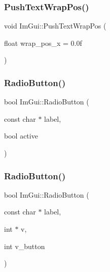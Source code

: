 \mbox{\label{namespace_im_gui_ab3b203dc94e7ee61a524609b3f3be50a}} 
\subsubsection{\texorpdfstring{Push\+Text\+Wrap\+Pos()}{PushTextWrapPos()}}
{\footnotesize\ttfamily void Im\+Gui\+::\+Push\+Text\+Wrap\+Pos (\begin{DoxyParamCaption}\item[{float}]{wrap\+\_\+pos\+\_\+x = {\ttfamily 0.0f} }\end{DoxyParamCaption})}

\mbox{\label{namespace_im_gui_a6b146763845cbad5a4144772279631bc}} 
\subsubsection{\texorpdfstring{Radio\+Button()}{RadioButton()}\hspace{0.1cm}{\footnotesize\ttfamily [1/2]}}
{\footnotesize\ttfamily bool Im\+Gui\+::\+Radio\+Button (\begin{DoxyParamCaption}\item[{const char $\ast$}]{label,  }\item[{bool}]{active }\end{DoxyParamCaption})}

\mbox{\label{namespace_im_gui_a018d2b61d2f00bb7a9dd2b1f933b93a5}} 
\subsubsection{\texorpdfstring{Radio\+Button()}{RadioButton()}\hspace{0.1cm}{\footnotesize\ttfamily [2/2]}}
{\footnotesize\ttfamily bool Im\+Gui\+::\+Radio\+Button (\begin{DoxyParamCaption}\item[{const char $\ast$}]{label,  }\item[{int $\ast$}]{v,  }\item[{int}]{v\+\_\+button }\end{DoxyParamCaption})}

